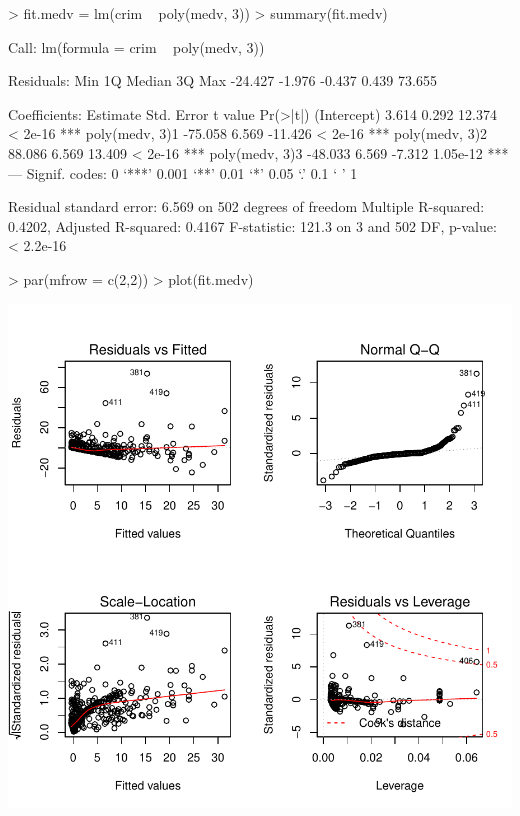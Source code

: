 \documentclass[a4paper]{article}
\begin{document}
\begin{Schunk}
\begin{Sinput}
> fit.medv = lm(crim ~ poly(medv, 3))
> summary(fit.medv)
\end{Sinput}
\begin{Soutput}
Call:
lm(formula = crim ~ poly(medv, 3))

Residuals:
    Min      1Q  Median      3Q     Max 
-24.427  -1.976  -0.437   0.439  73.655 

Coefficients:
               Estimate Std. Error t value Pr(>|t|)    
(Intercept)       3.614      0.292  12.374  < 2e-16 ***
poly(medv, 3)1  -75.058      6.569 -11.426  < 2e-16 ***
poly(medv, 3)2   88.086      6.569  13.409  < 2e-16 ***
poly(medv, 3)3  -48.033      6.569  -7.312 1.05e-12 ***
---
Signif. codes:  0 ‘***’ 0.001 ‘**’ 0.01 ‘*’ 0.05 ‘.’ 0.1 ‘ ’ 1

Residual standard error: 6.569 on 502 degrees of freedom
Multiple R-squared:  0.4202,	Adjusted R-squared:  0.4167 
F-statistic: 121.3 on 3 and 502 DF,  p-value: < 2.2e-16
\end{Soutput}
\begin{Sinput}
> par(mfrow = c(2,2))
> plot(fit.medv)
\end{Sinput}
\end{Schunk}
\includegraphics{mutivariblelm-medv2}
\end{document}
